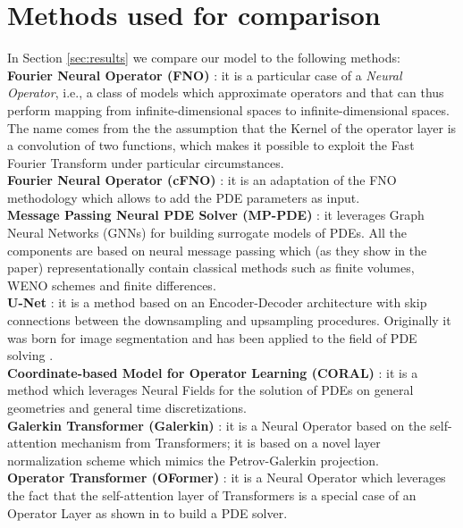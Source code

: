 \section{Methods used for comparison}
In Section \ref{sec:results} we compare our model to the following methods:
\\
\textbf{Fourier Neural Operator (FNO)} \cite{li2020fourier}: it is a particular case of a \textit{Neural Operator}, i.e., a class of models which approximate operators and that can thus perform mapping from infinite-dimensional spaces to infinite-dimensional spaces. The name comes from the the assumption that the Kernel of the operator layer is a convolution of two functions, which makes it possible to exploit the Fast Fourier Transform under particular circumstances.
\\
\textbf{Fourier Neural Operator (cFNO)} \cite{takamoto2023learning}: it is an adaptation of the FNO methodology which allows to add the PDE parameters as input.
\\
\textbf{Message Passing Neural PDE Solver (MP-PDE)} \cite{brandstetter2022message}: it leverages Graph Neural Networks (GNNs) for building surrogate models of PDEs. All the components are based on neural message passing which (as they show in the paper) representationally contain classical methods such as finite volumes, WENO schemes and finite differences.
\\
\textbf{U-Net} \cite{ronneberger2015u}: it is a method based on an Encoder-Decoder architecture with skip connections between the downsampling and upsampling procedures. Originally it was born for image segmentation and has been applied to the field of PDE solving \cite{gupta2022towards}.
\\
\textbf{Coordinate-based Model for Operator Learning (CORAL)} \cite{coral}: it is a method which leverages Neural Fields \cite{xie2022neural} for the solution of PDEs on general geometries and general time discretizations.
\\
\textbf{Galerkin Transformer (Galerkin)} \cite{cao2021choose}: it is a Neural Operator based on the self-attention mechanism from Transformers; it is based on a novel layer normalization scheme which mimics the Petrov-Galerkin projection. 
\\
\textbf{Operator Transformer (OFormer)} \cite{li2023transformer}: it is a Neural Operator which leverages the fact that the self-attention layer of Transformers is a special case of an Operator Layer as shown in \cite{kovachki2021neural} to build a PDE solver.
\\
